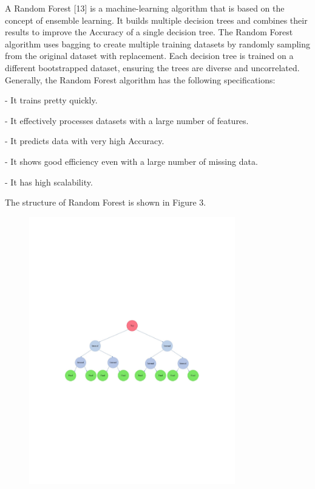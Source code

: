 A Random Forest {[}13{]} is a machine-learning algorithm that is based
on the concept of ensemble learning. It builds multiple decision trees
and combines their results to improve the Accuracy of a single decision
tree. The Random Forest algorithm uses bagging to create multiple
training datasets by randomly sampling from the original dataset with
replacement. Each decision tree is trained on a different bootstrapped
dataset, ensuring the trees are diverse and uncorrelated. Generally, the
Random Forest algorithm has the following specifications:

- It trains pretty quickly.

- It effectively processes datasets with a large number of features.

- It predicts data with very high Accuracy.

- It shows good efficiency even with a large number of missing data.

- It has high scalability.

The structure of Random Forest is shown in Figure 3.

\begin{figure}[H]
	\centering
	\includegraphics[width=0.8\textwidth]{media/ict/image39}
	\caption*{}
\end{figure}


